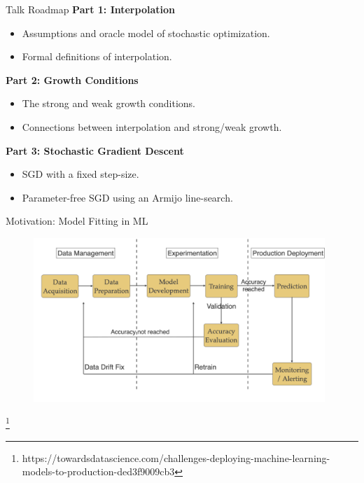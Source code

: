\documentclass[mathserif,notheorems, hyperref={colorlinks, citecolor=blue, urlcolor=blue, linkcolor=blue}]{beamer}
\newcommand{\source}[1]{{\let\thefootnote\relax\footnote{{\tiny #1}}}}
\begin{document}
    \begin{frame}{Talk Roadmap}
        \textbf{Part 1: Interpolation}
        \begin{itemize}
            \item Assumptions and oracle model of stochastic optimization.
            \item Formal definitions of interpolation.
        \end{itemize}

        \vspace{2ex}
        
        \textbf{Part 2: Growth Conditions}
        \begin{itemize}
            \item The strong and weak growth conditions. 
            \item Connections between interpolation and strong/weak growth.
        \end{itemize}
        
        \vspace{2ex}

        \textbf{Part 3: Stochastic Gradient Descent}
        \begin{itemize}
            \item SGD with a fixed step-size.
            \item Parameter-free SGD using an Armijo line-search.
        \end{itemize}
    \end{frame}

    \begin{frame}{Motivation: Model Fitting in ML}
       
       \begin{figure}
            \centering
            \includegraphics[width=0.98\textwidth]{figures/workflow} 
       \end{figure} 

       \source{https://towardsdatascience.com/challenges-deploying-machine-learning-models-to-production-ded3f9009cb3}
    \end{frame}
\end{document}
